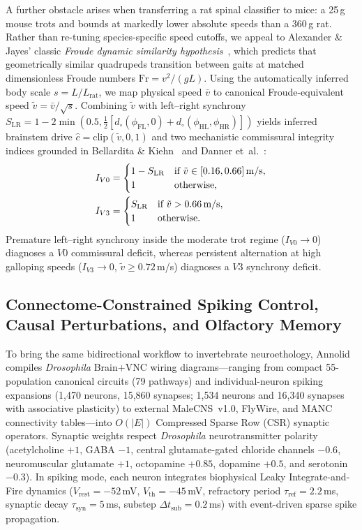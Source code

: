 \documentclass[10pt,twocolumn,letterpaper]{article}
\begin{document}
A further obstacle arises when transferring a rat spinal classifier to mice: a 25\,g mouse trots and bounds at markedly lower absolute speeds than a 360\,g rat. Rather than re-tuning species-specific speed cutoffs, we appeal to Alexander \& Jayes' classic \emph{Froude dynamic similarity hypothesis}~\cite{alexander1983froude}, which predicts that geometrically similar quadrupeds transition between gaits at matched dimensionless Froude numbers $\mathrm{Fr} = v^2 / (gL)$. Using the automatically inferred body scale $s = L / L_{\mathrm{rat}}$, we map physical speed $\bar{v}$ to canonical Froude-equivalent speed $\tilde{v} = \bar{v} / \sqrt{s}$. Combining $\tilde{v}$ with left--right synchrony $S_{\mathrm{LR}} = 1 - 2\min(0.5, \tfrac{1}{2}[d_\circ(\phi_{\mathrm{FL}}, 0) + d_\circ(\phi_{\mathrm{HL}}, \phi_{\mathrm{HR}})])$ yields inferred brainstem drive $\hat{c} = \mathrm{clip}(\tilde{v}, 0, 1)$ and two mechanistic commissural integrity indices grounded in Bellardita \& Kiehn~\cite{bellardita2015v0} and Danner et~al.~\cite{danner2017spinal}:
\begin{align}
  I_{V0} &= \begin{cases} 1 - S_{\mathrm{LR}} & \text{if } \tilde{v} \in [0.16, 0.66]\text{\,m/s}, \\ 1 & \text{otherwise}, \end{cases} \\
  I_{V3} &= \begin{cases} S_{\mathrm{LR}} & \text{if } \tilde{v} > 0.66\text{\,m/s}, \\ 1 & \text{otherwise}. \end{cases}
\end{align}
Premature left--right synchrony inside the moderate trot regime ($I_{V0} \to 0$) diagnoses a $V0$ commissural deficit, whereas persistent alternation at high galloping speeds ($I_{V3} \to 0$, $\tilde{v} \ge 0.72$\,m/s) diagnoses a $V3$ synchrony deficit.

\subsection{Connectome-Constrained Spiking Control, Causal Perturbations, and Olfactory Memory}

To bring the same bidirectional workflow to invertebrate neuroethology, Annolid compiles \emph{Drosophila} Brain+VNC wiring diagrams---ranging from compact 55-population canonical circuits (79 pathways) and individual-neuron spiking expansions (1,470 neurons, 15,860 synapses; 1,534 neurons and 16,340 synapses with associative plasticity) to external MaleCNS~v1.0, FlyWire, and MANC connectivity tables---into $O(|E|)$ Compressed Sparse Row (CSR) synaptic operators. Synaptic weights respect \emph{Drosophila} neurotransmitter polarity (acetylcholine $+1$, GABA $-1$, central glutamate-gated chloride channels $-0.6$, neuromuscular glutamate $+1$, octopamine $+0.85$, dopamine $+0.5$, and serotonin $-0.3$). In spiking mode, each neuron integrates biophysical Leaky Integrate-and-Fire dynamics ($V_{\mathrm{rest}}=-52$\,mV, $V_{\mathrm{th}}=-45$\,mV, refractory period $\tau_{\mathrm{ref}}=2.2$\,ms, synaptic decay $\tau_{\mathrm{syn}}=5$\,ms, substep $\Delta t_{\mathrm{sub}}=0.2$\,ms) with event-driven sparse spike propagation.
\end{document}
